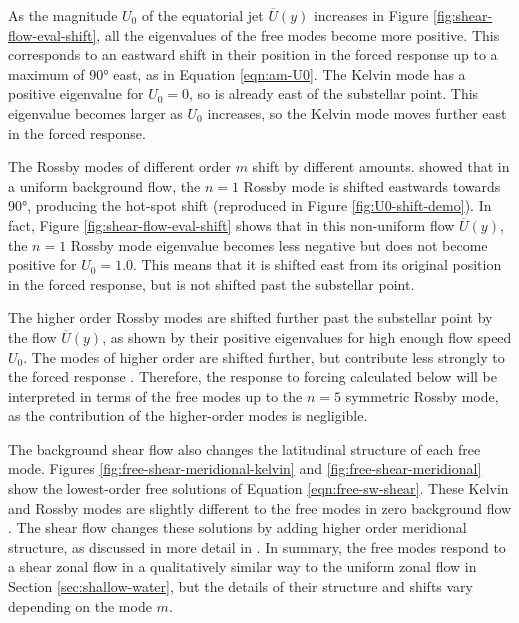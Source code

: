 
As the magnitude $U_{0}$ of the equatorial jet $\overline{U}(y)$ increases in Figure \ref{fig:shear-flow-eval-shift}, all the eigenvalues of the free modes become more positive. This corresponds to an eastward shift in their position in the forced response up to a maximum of \ang{+90} east, as in Equation \ref{eqn:am-U0}. The Kelvin mode has a positive eigenvalue for $U_{0}=0$, so is already east of the substellar point. This eigenvalue becomes larger as $U_{0}$ increases, so the Kelvin mode moves further east in the forced response.

The Rossby modes of different order $m$ shift by different amounts. \citet{tsai2014three} showed that in a uniform background flow, the $n=1$ Rossby mode is shifted eastwards towards \ang{+90}, producing the hot-spot shift (reproduced in Figure \ref{fig:U0-shift-demo}). In fact, Figure \ref{fig:shear-flow-eval-shift} shows that in this non-uniform flow $\overline{U}(y)$, the $n=1$ Rossby mode eigenvalue becomes less negative but does not become positive for $U_{0}=1.0$. This means that it is shifted east from its original position in the forced response, but is not shifted past the substellar point.

The higher order Rossby modes are shifted further past the substellar point by the flow $\overline{U}(y)$, as shown by their positive eigenvalues for high enough flow speed $U_{0}$. The modes of higher order are shifted further, but contribute less strongly to the forced response \citep{matsuno1966quasi}. Therefore, the response to forcing calculated below will be interpreted in terms of the free modes up to the $n=5$ symmetric Rossby mode, as the contribution of the higher-order modes is negligible.

The background shear flow also changes the latitudinal structure of each free mode. Figures \ref{fig:free-shear-meridional-kelvin} and \ref{fig:free-shear-meridional} show the lowest-order free solutions of Equation \ref{eqn:free-sw-shear}. These Kelvin and Rossby modes are slightly different to the free modes in zero background flow \citep{matsuno1966quasi}. The shear flow changes these solutions by adding higher order meridional structure, as discussed in more detail in \citet{boyd1978sheari}. In summary, the free modes respond to a shear zonal flow in a qualitatively similar way to the uniform zonal flow in Section \ref{sec:shallow-water}, but the details of their structure and shifts vary depending on the mode $m$.



